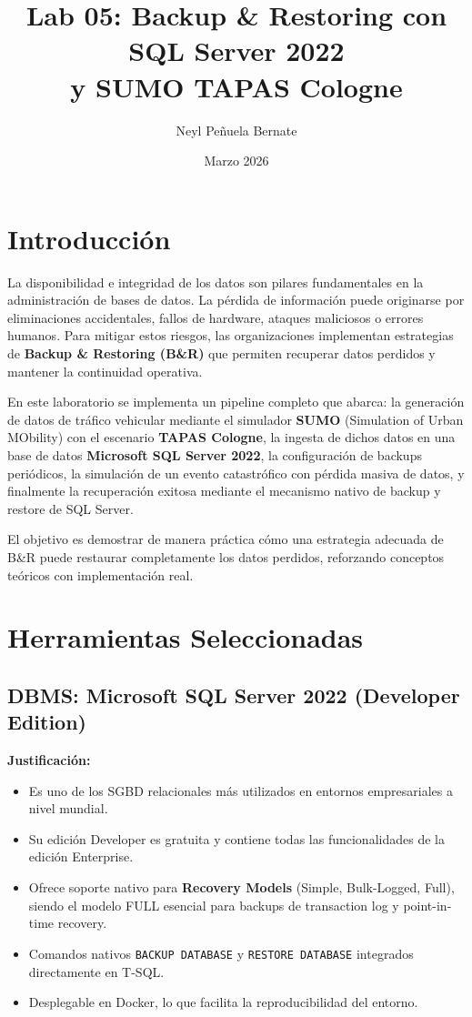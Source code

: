 \documentclass[12pt,a4paper]{article}
\title{Lab 05: Backup \& Restoring con SQL Server 2022\\y SUMO TAPAS Cologne}
\author{Neyl Pe\~nuela Bernate}
\date{Marzo 2026}
\begin{document}
\maketitle
\tableofcontents
\newpage

\section{Introducci\'on}

La disponibilidad e integridad de los datos son pilares fundamentales en la administraci\'on de bases de datos. La p\'erdida de informaci\'on puede originarse por eliminaciones accidentales, fallos de hardware, ataques maliciosos o errores humanos. Para mitigar estos riesgos, las organizaciones implementan estrategias de \textbf{Backup \& Restoring (B\&R)} que permiten recuperar datos perdidos y mantener la continuidad operativa.

En este laboratorio se implementa un pipeline completo que abarca: la generaci\'on de datos de tr\'afico vehicular mediante el simulador \textbf{SUMO} (Simulation of Urban MObility) con el escenario \textbf{TAPAS Cologne}, la ingesta de dichos datos en una base de datos \textbf{Microsoft SQL Server 2022}, la configuraci\'on de backups peri\'odicos, la simulaci\'on de un evento catastr\'ofico con p\'erdida masiva de datos, y finalmente la recuperaci\'on exitosa mediante el mecanismo nativo de backup y restore de SQL Server.

El objetivo es demostrar de manera pr\'actica c\'omo una estrategia adecuada de B\&R puede restaurar completamente los datos perdidos, reforzando conceptos te\'oricos con implementaci\'on real.

\section{Herramientas Seleccionadas}

\subsection{DBMS: Microsoft SQL Server 2022 (Developer Edition)}

\textbf{Justificaci\'on:}
\begin{itemize}
  \item Es uno de los SGBD relacionales m\'as utilizados en entornos empresariales a nivel mundial.
  \item Su edici\'on Developer es gratuita y contiene todas las funcionalidades de la edici\'on Enterprise.
  \item Ofrece soporte nativo para \textbf{Recovery Models} (Simple, Bulk-Logged, Full), siendo el modelo FULL esencial para backups de transaction log y point-in-time recovery.
  \item Comandos nativos \texttt{BACKUP DATABASE} y \texttt{RESTORE DATABASE} integrados directamente en T-SQL.
  \item Desplegable en Docker, lo que facilita la reproducibilidad del entorno.
\end{itemize}
\end{document}
